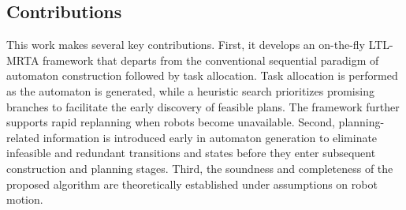 \documentclass[lettersize,journal]{IEEEtran}
\theoremstyle{italiclemma}
\theoremstyle{italiclemma}
\theoremstyle{definition}
\begin{document}














\subsection{Contributions}

This work makes several key contributions.  First, it develops an on-the-fly LTL-MRTA framework that departs from the conventional sequential paradigm of automaton construction followed by task allocation. Task allocation is performed as the automaton is generated, while a heuristic search prioritizes promising branches to facilitate the early discovery of feasible plans. The framework further supports rapid replanning when robots become unavailable. Second, planning-related information is introduced early in automaton generation to eliminate infeasible and redundant transitions and states before they enter subsequent construction and planning stages. Third, the soundness and completeness of the proposed algorithm are theoretically established under assumptions on robot motion.




\end{document}
